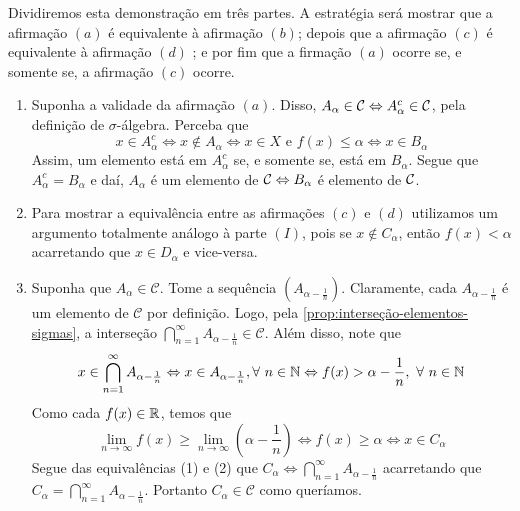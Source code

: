 \begin{prova}
    Dividiremos esta demonstração em três partes. A estratégia será mostrar que a afirmação $(a)$ é equivalente à afirmação $(b)$; depois que a afirmação $(c)$ é equivalente à afirmação $(d)$ ; e por fim que a firmação $(a)$ ocorre se, e somente se, a afirmação $(c)$ ocorre. 
    \begin{enumerate}[label* = (\Roman*)]
        \item Suponha a validade da afirmação $(a)$. 
        Disso, $A_\alpha \in \operatorname{\mathcal{C}} \Leftrightarrow A_\alpha^c \in \operatorname{\mathcal{C}}$, pela definição de $\sigma$-álgebra.
	    Perceba que 
	    $$
	    x \in A_\alpha^c 
	    \Leftrightarrow
	    x \notin A_\alpha
	    \Leftrightarrow  
	    x \in X \textrm{\ e \ } f(x) \leq \alpha
	    \Leftrightarrow 
	    x \in B_\alpha    
		$$ 
		Assim, um elemento está em $A_\alpha^c$ se, e somente se, está em $B_\alpha$. Segue que $A_\alpha^c = B_\alpha$ e daí, $A_\alpha$ é um elemento de $\operatorname{\mathcal{C}} \Leftrightarrow B_\alpha$ é elemento de $\operatorname{\mathcal{C}}$.
		\item Para mostrar a equivalência entre as afirmações $(c)$ e $(d)$ utilizamos um argumento totalmente análogo à parte $(I)$, pois se $x \notin C_\alpha$, então $f(x) < \alpha$ acarretando que $x \in D_\alpha$ e vice-versa.
		\item Suponha que $A_\alpha \in \mathcal{C}$. Tome a sequência $\left(A_{\alpha -\frac{1}{n}}\right)$. Claramente, cada $A_{\alpha - \frac{1}{n}}$ é um elemento de $\mathcal{C}$ por definição.
		Logo, pela \ref{prop:interseção-elementos-sigmas}, a interseção $\displaystyle \bigcap_{n = 1}^\infty A_{\alpha -\frac{1}{n}} \in \mathcal{C}$.
		Além disso, note que 
		\begin{equation}
			x \in \displaystyle \bigcap_{n = 1}^\infty A_{\alpha -\frac{1}{n}}
			\Leftrightarrow
		 	x \in A_{\alpha - \frac{1}{n}}, \forall \ n \in \operatorname{\mathbb{N}}
			\Leftrightarrow
			f(x)> \alpha -\dfrac{1}{n},  \ \forall \ n \in \operatorname{\mathbb{N}}
		\end{equation}
		Como cada $f(x) \in \mathbb{R}$, temos que
		\begin{equation}
			\lim_{n \to \infty} f(x) \geq \lim_{n \to \infty} \left(\alpha - \dfrac{1}{n}\right)
			\Leftrightarrow
			f(x) \geq \alpha
			\Leftrightarrow
			x \in C_\alpha
		\end{equation}
		Segue das equivalências (1) e (2) que $C_\alpha \Leftrightarrow \displaystyle \bigcap_{n = 1}^\infty A_{\alpha -\frac{1}{n}}$
		acarretando que $C_\alpha = \displaystyle \bigcap_{n = 1}^\infty A_{\alpha -\frac{1}{n}} $.
		Portanto $C_\alpha \in \mathcal{C}$ como queríamos.
   \end{enumerate}
	

\end{prova}
